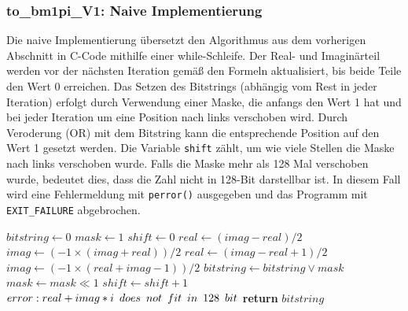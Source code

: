 \documentclass[course=erap]{aspdoc}
\begin{document}
\subsubsection{to\_bm1pi\_V1: Naive Implementierung}
Die naive Implementierung übersetzt den Algorithmus aus dem vorherigen Abschnitt \cite{CtoBNaive} in C-Code mithilfe einer while-Schleife. Der Real- und Imaginärteil werden vor der nächsten Iteration gemäß den Formeln aktualisiert, bis beide Teile den Wert 0 erreichen. Das Setzen des Bitstrings (abhängig vom Rest in jeder Iteration) erfolgt durch Verwendung einer Maske, die anfangs den Wert 1 hat und bei jeder Iteration um eine Position nach links verschoben wird. Durch Veroderung (OR) mit dem Bitstring kann die entsprechende Position auf den Wert 1 gesetzt werden.
Die Variable \texttt{shift} zählt, um wie viele Stellen die Maske nach links verschoben wurde. Falls die Maske mehr als 128 Mal verschoben wurde, bedeutet dies, dass die Zahl nicht in 128-Bit darstellbar ist. In diesem Fall wird eine Fehlermeldung mit \texttt{perror()} ausgegeben und das Programm mit \texttt{EXIT\_FAILURE} abgebrochen.
\begin{algorithm}
\caption{Pseudocode f{\"u}r unsigned \_\_int128 to\_bm1pi(\_\_int128 real, \_\_int128 imag)}
\begin{algorithmic}
\State $bitstring \gets 0$
\State $mask \gets 1$
\State $shift \gets 0$
\State $real \gets (imag - real) / 2$
\State $imag \gets (-1 \times (imag + real)) / 2$
\Else
\State $real \gets (imag - real + 1) / 2$
\State $imag \gets (-1 \times (real + imag - 1)) / 2$
\State $bitstring \gets bitstring \lor mask$
\EndIf
\State $mask \gets mask \ll 1$
\State $shift \gets shift + 1$
\State $error: real+imag*i\hspace{0.5em}does\hspace{0.5em}not\hspace{0.5em}fit\hspace{0.5em}in\hspace{0.5em}128\hspace{0.5em}bit$
\EndIf
\EndWhile{}
\State \textbf{return} $bitstring$
\end{algorithmic}
\end{algorithm}
\end{document}
